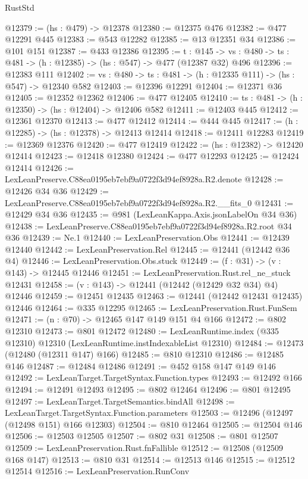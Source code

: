 \begin{lexlean}{RustStd}
\begin{coremodule}
@12379 := (hs : @479) -> @12378
@12380 := @12375 @476
@12382 := @477 @12291 @445
@12383 := @543 @12282
@12385 := @13 @12351 @34
@12386 := @101 @151
@12387 := @433 @12386
@12395 := {t : @145} ->
  {vs : @480} -> {ts : @481} -> (h : @12385) -> (hs : @547) -> @477 (@12387 @32) @496
@12396 := @12383 @111
@12402 := {vs : @480} -> {ts : @481} -> (h : @12335 @111) -> (hs : @547) -> @12340 @582
@12403 := @12396 @12291
@12404 := @12371 @36
@12405 := @12352 @12362
@12406 := @477 @12405
@12410 := {ts : @481} -> (h : @12350) -> (hs : @12404) -> @12406 @582
@12411 := @12403 @445
@12412 := @12361 @12370
@12413 := @477 @12412
@12414 := @444 @445
@12417 := (h : @12285) -> (hs : @12378) -> @12413 @12414
@12418 := @12411 @12283
@12419 := @12369 @12376
@12420 := @477 @12419
@12422 := (hs : @12382) -> @12420 @12414
@12423 := @12418 @12380
@12424 := @477 @12293
@12425 := @12424 @12414
@12426 := LexLeanPreserve.C88ea0195eb7ebf9a0722f3d94ef8928a.R2.denote
@12428 := @12426 @34 @36
@12429 := LexLeanPreserve.C88ea0195eb7ebf9a0722f3d94ef8928a.R2.__fits_0
@12431 := @12429 @34 @36
@12435 := @981 (LexLeanKappa.Axis.jsonLabelOn @34 @36)
@12438 := LexLeanPreserve.C88ea0195eb7ebf9a0722f3d94ef8928a.R2.root @34 @36
@12439 := Ne.{1}
@12440 := LexLeanPreservation.Obs
@12441 := @12439 @12440
@12442 := LexLeanPreservation.Rel
@12445 := @12441 (@12442 @36 @4)
@12446 := LexLeanPreservation.Obs.stuck
@12449 := (f : @31) -> (v : @143) -> @12445 @12446
@12451 := LexLeanPreservation.Rust.rel_ne_stuck @12431
@12458 := (v : @143) -> @12441 (@12442 (@12429 @32 @34) @4) @12446
@12459 := @12451 @12435
@12463 := @12441 (@12442 @12431 @12435) @12446
@12464 := @335 @12295
@12465 := LexLeanPreservation.Rust.FunSem
@12471 := (n : @70) -> @12465 @147 @149 @151 @4 @166
@12472 := @802 @12310
@12473 := @801 @12472
@12480 := LexLeanRuntime.index (@335 @12310) @12310 (LexLeanRuntime.instIndexableList @12310)
@12484 := @12473 (@12480 (@12311 @147) @166)
@12485 := @810 @12310
@12486 := @12485 @146
@12487 := @12484 @12486
@12491 := @452 @158 @147 @149 @146
@12492 := LexLeanTarget.TargetSyntax.Function.types
@12493 := @12492 @166
@12494 := @12491 @12493
@12495 := @802 @12464
@12496 := @801 @12495
@12497 := LexLeanTarget.TargetSemantics.bindAll
@12498 := LexLeanTarget.TargetSyntax.Function.parameters
@12503 := @12496 (@12497 (@12498 @151) @166 @12303)
@12504 := @810 @12464
@12505 := @12504 @146
@12506 := @12503 @12505
@12507 := @802 @31
@12508 := @801 @12507
@12509 := LexLeanPreservation.Rust.fnFallible
@12512 := @12508 (@12509 @168 @147)
@12513 := @810 @31
@12514 := @12513 @146
@12515 := @12512 @12514
@12516 := LexLeanPreservation.RunConv

\end{coremodule}
\end{lexlean}
